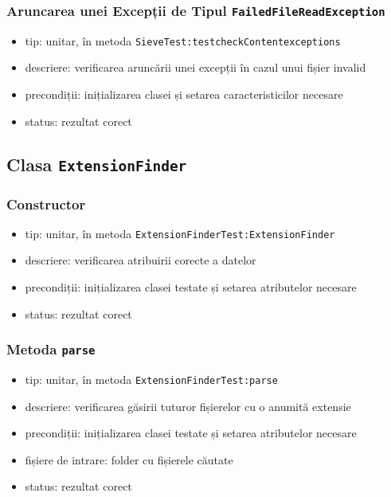 \documentclass[12pt]{article}
\begin{document}
\subsubsection{Aruncarea unei Excepții de Tipul \texttt{FailedFileReadException}}

\begin{itemize}
    \item tip: unitar, în metoda \texttt{SieveTest:testcheckContentexceptions}
    \item descriere: verificarea aruncării unei excepții în cazul unui fișier invalid
    \item precondiții: inițializarea clasei și setarea caracteristicilor necesare
    \item status: rezultat corect
\end{itemize}

\subsection{Clasa \texttt{ExtensionFinder}}

\subsubsection{Constructor}

\begin{itemize}
    \item tip: unitar, în metoda \texttt{ExtensionFinderTest:ExtensionFinder}
    \item descriere: verificarea atribuirii corecte a datelor
    \item precondiții: inițializarea clasei testate și setarea atributelor necesare
    \item status: rezultat corect
\end{itemize}

\subsubsection{Metoda \texttt{parse}}

\begin{itemize}
    \item tip: unitar, în metoda \texttt{ExtensionFinderTest:parse}
    \item descriere: verificarea găsirii tuturor fișierelor cu o anumită extensie
    \item precondiții: inițializarea clasei testate și setarea atributelor necesare
    \item fișiere de intrare: folder cu fișierele căutate
    \item status: rezultat corect
\end{itemize}
\end{document}
